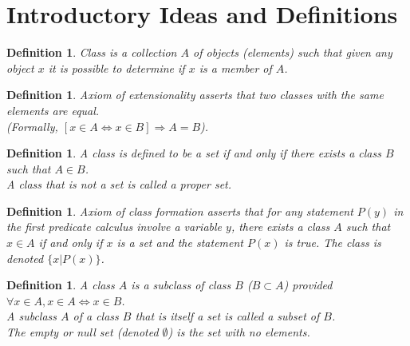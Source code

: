 \documentclass[a4paper,sfsidenotes,openany]{tufte-book}
\theoremstyle{theorem}
\newtheorem{definition}[theorem]{Definition}
\begin{document}
\section{Introductory Ideas and Definitions}
\begin{fullwidth}

\begin{definition}
\textit{{\color{blue} Class}} is a collection $ A $ of objects (elements) such that given any object $ x $ it is possible to determine if $ x $ is a member of $ A $.\\
\end{definition}
\>

\begin{definition}
\textit{{\color{blue} Axiom of extensionality}} asserts that two classes with the same elements are equal. \\
(Formally, $ \left[x \in A \Longleftrightarrow x \in B \right] \Rightarrow A=B $).\\
\end{definition}
\>

\begin{definition}
A class is defined to be a \textit{{\color{blue} set}} if and only if there exists a class $ B $ such that $ A \in B $.\\
A class that is not a set is called a \textit{{\color{blue} proper set}}.\\
\end{definition}
\>

\begin{definition}
\textit{{\color{blue} Axiom of class formation}} asserts that for any statement $ P(y) $ in the first predicate calculus involve a variable $ y $, there exists a class $ A $ such that $ x \in A $ if and only if $ x $ is a set and the statement $ P(x) $ is true. The class is denoted 	$\{ x | P(x) \}$.\\
\end{definition}
\>

\begin{definition}
A class $ A $ is a \textit{{\color{blue} subclass}} of class $ B $ ($ B \subset A $) provided $ \forall x \in A, x \in A \Longleftrightarrow x \in B $. \\
A subclass $ A $ of a class $ B $ that is itself a set is called a \textit{{\color{blue} subset}} of $ B $.\\
The \textit{{\color{blue} empty or null set}} (denoted $\emptyset$) is the set with no elements.\\
\end{definition}
\>


\end{fullwidth}
\end{document}
